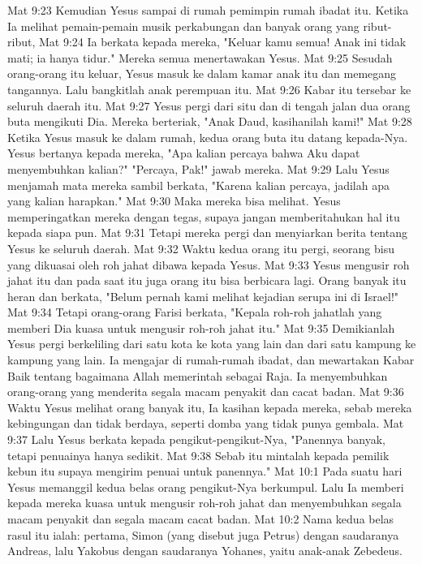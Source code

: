 Mat 9:23  Kemudian Yesus sampai di rumah pemimpin rumah ibadat itu. Ketika Ia melihat pemain-pemain musik perkabungan dan banyak orang yang ribut-ribut,
Mat 9:24  Ia berkata kepada mereka, "Keluar kamu semua! Anak ini tidak mati; ia hanya tidur." Mereka semua menertawakan Yesus.
Mat 9:25  Sesudah orang-orang itu keluar, Yesus masuk ke dalam kamar anak itu dan memegang tangannya. Lalu bangkitlah anak perempuan itu.
Mat 9:26  Kabar itu tersebar ke seluruh daerah itu.
Mat 9:27  Yesus pergi dari situ dan di tengah jalan dua orang buta mengikuti Dia. Mereka berteriak, "Anak Daud, kasihanilah kami!"
Mat 9:28  Ketika Yesus masuk ke dalam rumah, kedua orang buta itu datang kepada-Nya. Yesus bertanya kepada mereka, "Apa kalian percaya bahwa Aku dapat menyembuhkan kalian?" "Percaya, Pak!" jawab mereka.
Mat 9:29  Lalu Yesus menjamah mata mereka sambil berkata, "Karena kalian percaya, jadilah apa yang kalian harapkan."
Mat 9:30  Maka mereka bisa melihat. Yesus memperingatkan mereka dengan tegas, supaya jangan memberitahukan hal itu kepada siapa pun.
Mat 9:31  Tetapi mereka pergi dan menyiarkan berita tentang Yesus ke seluruh daerah.
Mat 9:32  Waktu kedua orang itu pergi, seorang bisu yang dikuasai oleh roh jahat dibawa kepada Yesus.
Mat 9:33  Yesus mengusir roh jahat itu dan pada saat itu juga orang itu bisa berbicara lagi. Orang banyak itu heran dan berkata, "Belum pernah kami melihat kejadian serupa ini di Israel!"
Mat 9:34  Tetapi orang-orang Farisi berkata, "Kepala roh-roh jahatlah yang memberi Dia kuasa untuk mengusir roh-roh jahat itu."
Mat 9:35  Demikianlah Yesus pergi berkeliling dari satu kota ke kota yang lain dan dari satu kampung ke kampung yang lain. Ia mengajar di rumah-rumah ibadat, dan mewartakan Kabar Baik tentang bagaimana Allah memerintah sebagai Raja. Ia menyembuhkan orang-orang yang menderita segala macam penyakit dan cacat badan.
Mat 9:36  Waktu Yesus melihat orang banyak itu, Ia kasihan kepada mereka, sebab mereka kebingungan dan tidak berdaya, seperti domba yang tidak punya gembala.
Mat 9:37  Lalu Yesus berkata kepada pengikut-pengikut-Nya, "Panennya banyak, tetapi penuainya hanya sedikit.
Mat 9:38  Sebab itu mintalah kepada pemilik kebun itu supaya mengirim penuai untuk panennya."
Mat 10:1  Pada suatu hari Yesus memanggil kedua belas orang pengikut-Nya berkumpul. Lalu Ia memberi kepada mereka kuasa untuk mengusir roh-roh jahat dan menyembuhkan segala macam penyakit dan segala macam cacat badan.
Mat 10:2  Nama kedua belas rasul itu ialah: pertama, Simon (yang disebut juga Petrus) dengan saudaranya Andreas, lalu Yakobus dengan saudaranya Yohanes, yaitu anak-anak Zebedeus.
